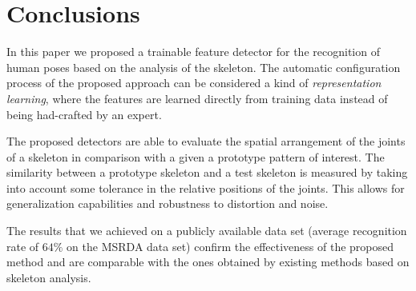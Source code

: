 \documentclass[runningheads,a4paper]{llncs}
\begin{document}




\section{Conclusions}
\label{sec:concl}

In this paper we proposed a trainable feature detector for the recognition of human poses based on the analysis of the skeleton.   
The automatic configuration process of the proposed approach can be considered a kind of \emph{representation learning}, where the features are learned directly from training data instead of being had-crafted by an expert. 

The proposed detectors are able to evaluate the spatial arrangement of the joints of a skeleton in comparison with a given a prototype pattern of interest. The similarity between a prototype skeleton and a test skeleton is measured by taking into account some tolerance in the relative positions of the joints. This allows for generalization capabilities and robustness to distortion and noise.

The results that we achieved on a publicly available data set (average recognition rate of $64\%$ on the MSRDA data set) confirm the effectiveness of the proposed method and are comparable with the ones obtained by existing methods based on skeleton analysis.




\end{document}
